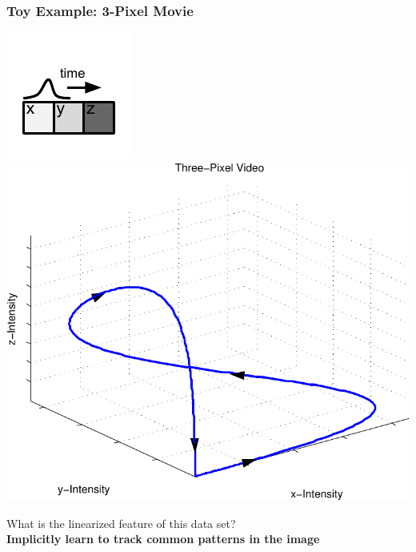 \documentclass{beamer}
\begin{document}
\begin{frame} 
\frametitle{Toy Example: 3-Pixel Movie}
\includegraphics[scale=1]{./Figures/Project2/fig1.pdf} 
\includegraphics[scale=0.5]{./Figures/Project2/fig2.pdf} \\
\begin{center} 
What is the linearized feature of this data set? \\
\textbf{Implicitly learn to track common patterns in the image}
\end{center} 
\end{frame} 
\end{document}
